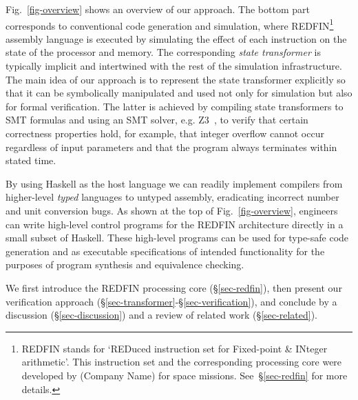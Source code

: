 Fig.~\ref{fig-overview} shows an overview of our approach. The bottom part
corresponds to conventional code generation and simulation, where
REDFIN\footnote{REDFIN stands for `REDuced instruction set for Fixed-point \&
INteger arithmetic'. This instruction set and the corresponding processing core
were developed by (Company Name) for space missions.
See~\S\ref{sec-redfin} for more details.} assembly language is executed by
simulating the effect of each instruction on the state of the processor and memory.
The corresponding \emph{state transformer} is typically implicit and intertwined
with the rest of the simulation infrastructure. The main idea of our approach is
to represent the state transformer explicitly so that it can be symbolically
manipulated and used not only for simulation but also for formal verification.
The latter is achieved by compiling state transformers to SMT formulas and using
an SMT solver, e.g. Z3~\cite{de2008z3}, to verify that certain correctness
properties hold, for example, that integer overflow cannot occur regardless of
input parameters and that the program always terminates within stated time.

By using Haskell as the host language we can readily implement compilers from
higher-level \emph{typed} languages to untyped assembly, eradicating incorrect
number and unit conversion bugs. As shown at the top of Fig.~\ref{fig-overview},
engineers can write high-level control programs for the REDFIN architecture
directly in a small subset of Haskell. These high-level programs can be used for
type-safe code generation and as executable specifications of intended
functionality for the purposes of program synthesis and equivalence checking.


We first introduce the REDFIN processing core (\S\ref{sec-redfin}), then
present our verification approach (\S\ref{sec-transformer}-\S\ref{sec-verification}),
and conclude by a discussion (\S\ref{sec-discussion}) and a review of related
work (\S\ref{sec-related}).
